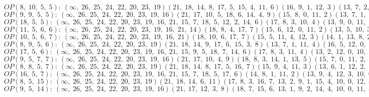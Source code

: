 $OP(8, \;10, \;5, \;5): \:(\infty, \;26, \;25, \;24, \;22, \;20, \;23, \;19)(21, \;18, \;14, \;8, \;17, \;5, \;15, \;4, \;11, \;6)(16, \;9, \;1, \;12, \;3)(13, \;7, \;2, \;10, \;0)$\\
$OP(9, \;9, \;5, \;5): \:(\infty, \;26, \;25, \;24, \;22, \;20, \;23, \;19, \;16)(21, \;17, \;10, \;5, \;18, \;6, \;14, \;4, \;9)(15, \;8, \;0, \;11, \;2)(13, \;7, \;1, \;12, \;3)$\\
$OP(18, \;5, \;5): \:(\infty, \;26, \;25, \;24, \;22, \;20, \;23, \;19, \;16, \;21, \;15, \;7, \;18, \;5, \;12, \;2, \;14, \;6)(17, \;8, \;3, \;10, \;4)(13, \;9, \;0, \;11, \;1)$\\
$OP(11, \;5, \;6, \;6): \:(\infty, \;26, \;25, \;24, \;22, \;20, \;23, \;19, \;16, \;21, \;14)(18, \;8, \;4, \;17, \;7)(15, \;6, \;12, \;0, \;11, \;2)(13, \;5, \;10, \;3, \;9, \;1)$\\
$OP(10, \;5, \;6, \;7): \:(\infty, \;26, \;25, \;24, \;22, \;20, \;23, \;19, \;16, \;21)(18, \;10, \;6, \;17, \;7)(15, \;5, \;11, \;4, \;12, \;3)(14, \;1, \;13, \;8, \;2, \;9, \;0)$\\
$OP(8, \;9, \;5, \;6): \:(\infty, \;26, \;25, \;24, \;22, \;20, \;23, \;19)(21, \;18, \;14, \;9, \;17, \;6, \;15, \;3, \;8)(13, \;7, \;1, \;11, \;4)(16, \;5, \;12, \;0, \;10, \;2)$\\
$OP(17, \;5, \;6): \:(\infty, \;26, \;25, \;24, \;22, \;20, \;23, \;19, \;16, \;21, \;15, \;9, \;5, \;18, \;7, \;14, \;6)(17, \;8, \;3, \;11, \;4)(13, \;2, \;12, \;0, \;10, \;1)$\\
$OP(9, \;5, \;7, \;7): \:(\infty, \;26, \;25, \;24, \;22, \;20, \;23, \;19, \;16)(21, \;17, \;10, \;4, \;9)(18, \;8, \;3, \;14, \;1, \;13, \;5)(15, \;7, \;0, \;11, \;2, \;12, \;6)$\\
$OP(8, \;8, \;5, \;7): \:(\infty, \;26, \;25, \;24, \;22, \;20, \;23, \;19)(21, \;18, \;14, \;8, \;17, \;5, \;16, \;7)(15, \;9, \;4, \;11, \;3)(13, \;6, \;1, \;12, \;2, \;10, \;0)$\\
$OP(16, \;5, \;7): \:(\infty, \;26, \;25, \;24, \;22, \;20, \;23, \;19, \;16, \;21, \;15, \;7, \;18, \;5, \;17, \;6)(14, \;8, \;1, \;11, \;2)(13, \;9, \;4, \;12, \;3, \;10, \;0)$\\
$OP(8, \;5, \;15): \:(\infty, \;26, \;25, \;24, \;22, \;20, \;23, \;19)(21, \;18, \;14, \;6, \;11)(17, \;8, \;3, \;16, \;7, \;13, \;2, \;9, \;1, \;15, \;4, \;10, \;0, \;12, \;5)$\\
$OP(9, \;5, \;14): \:(\infty, \;26, \;25, \;24, \;22, \;20, \;23, \;19, \;16)(21, \;17, \;12, \;3, \;8)(18, \;7, \;15, \;6, \;13, \;1, \;9, \;2, \;14, \;4, \;10, \;0, \;11, \;5)$\\
